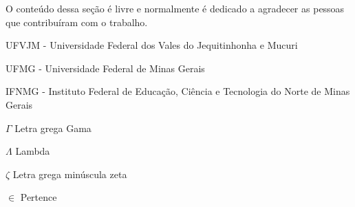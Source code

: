 \documentclass[12pt,a4paper,twoside,sumario=abnt-6027-2012,chapter=TITLE]{abntex2}
\begin{document}


\begin{agradecimentos}
O conteúdo dessa seção é livre e normalmente é dedicado a agradecer as pessoas que contribuíram com o trabalho.
\end{agradecimentos}


 
 

\cleardoublepage


\cleardoublepage


\listoffigures*
\cleardoublepage

\listoftables*
\cleardoublepage


\begin{siglas}
\item UFVJM - Universidade Federal dos Vales do Jequitinhonha e Mucuri
\item UFMG - Universidade Federal de Minas Gerais
\item IFNMG - Instituto Federal de Educação, Ciência e Tecnologia do Norte de Minas Gerais
\end{siglas}


\newpage

\begin{simbolos}
\item[$ \Gamma $] Letra grega Gama
\item[$ \Lambda $] Lambda
\item[$ \zeta $] Letra grega minúscula zeta
\item[$ \in $] Pertence
\end{simbolos}
\end{document}
